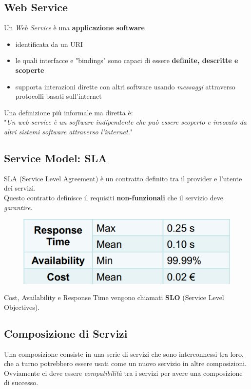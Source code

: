 \documentclass[12pt, a4paper]{article}
\begin{document}
    \subsection{Web Service}
    Un \textit{Web Service} è una \textbf{applicazione software}
    \begin{itemize}
        \item identificata da un URI
        \item le quali interfacce e "bindings" sono capaci di essere \textbf{definite, descritte e scoperte}
        \item supporta interazioni dirette con altri software usando \textit{messaggi} attraverso protocolli basati sull'internet
    \end{itemize}
    Una definizione più informale ma diretta è:\\
    "\textit{Un web service è un software indipendente che può essere scoperto e invocato da altri sistemi software attraverso l'internet.}"

    \newpage
    \subsection{Service Model: SLA}
    SLA (Service Level Agreement) è un contratto definito tra il provider e l'utente dei servizi.
    \\Questo contratto definisce il requisiti \textbf{non-funzionali} che il servizio deve \textit{garantire}.

    \begin{figure}[htbp]
        \centering
        \includegraphics[scale=0.5]{slo.png}
    \end{figure}
    Cost, Availability e Response Time vengono chiamati \textbf{SLO} (Service Level Objectives).

    \subsection{Composizione di Servizi}
    Una composizione consiste in una serie di servizi che sono interconnessi tra loro, che a turno
    potrebbero essere usati come un nuovo servizio in altre composizioni. Ovviamente ci deve essere \textit{compatibilità}
    tra i servizi per avere una composizione di successo.
\end{document}
